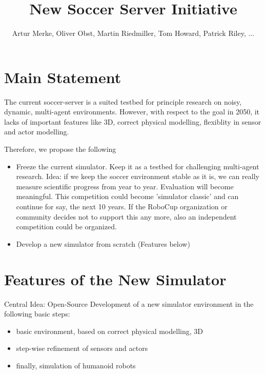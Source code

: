 \documentclass[a4paper,12pt]{article}
\begin{document}
\title{New Soccer Server Initiative}
\author{Artur Merke, Oliver Obst, Martin Riedmiller, Tom Howard,
  Patrick Riley, ...}

\maketitle

\section{Main Statement}

The current soccer-server is a suited testbed for principle research
on noisy, dynamic, multi-agent environments. However, with respect to
the goal in 2050, it lacks of important features like 3D, correct
physical modelling, flexiblity in sensor and actor modelling.

Therefore, we propose the following

\begin{itemize}
\item Freeze the current simulator. Keep it as a testbed for
  challenging multi-agent research.  Idea: if we keep the soccer
  environment stable as it is, we can really measure scientific
  progress from year to year. Evaluation will become meaningful.  This
  competition could become 'simulator classic' and can continue for
  say, the next 10 years.  If the RoboCup organization or community
  decides not to support this any more, also an independent
  competition could be organized.
\item Develop a new simulator from scratch (Features below)
\end{itemize}

\section{Features of the New Simulator}

Central Idea: Open-Source Development of a new simulator environment
in the following basic steps:

\begin{itemize}
\item basic environment, based on correct physical modelling, 3D
\item step-wise refinement of sensors and actors
\item finally, simulation of  humanoid robots
\end{itemize}
\end{document}
